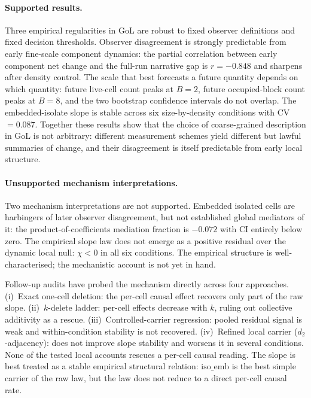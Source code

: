 \documentclass[aip,cha,preprint,nofootinbib]{revtex4-2}
\newcommand{\iso}{\mathrm{iso\_emb}}
\begin{document}
\paragraph{Supported results.}
Three empirical regularities in GoL are robust to fixed observer definitions
and fixed decision thresholds.
Observer disagreement is strongly predictable from early fine-scale component
dynamics: the partial correlation between early component net change and the
full-run narrative gap is $r=-0.848$ and sharpens after density control.
The scale that best forecasts a future quantity depends on which quantity:
future live-cell count peaks at $B=2$, future occupied-block count peaks at
$B=8$, and the two bootstrap confidence intervals do not overlap.
The embedded-isolate slope is stable across six size-by-density conditions
with CV~$=0.087$.
Together these results show that the choice of coarse-grained description
in GoL is not arbitrary: different measurement schemes yield different but
lawful summaries of change, and their disagreement is itself predictable from
early local structure.

\paragraph{Unsupported mechanism interpretations.}
Two mechanism interpretations are not supported.
Embedded isolated cells are harbingers of later observer disagreement, but
not established global mediators of it: the product-of-coefficients mediation
fraction is $-0.072$ with CI entirely below zero.
The empirical slope law does not emerge as a positive residual over the
dynamic local null: $\chi < 0$ in all six conditions.
The empirical structure is well-characterised; the mechanistic account is not
yet in hand.

Follow-up audits have probed the mechanism directly across four approaches.
(i)~Exact one-cell deletion: the per-cell causal effect recovers only part of
the raw slope.
(ii)~$k$-delete ladder: per-cell effects decrease with $k$, ruling out
collective additivity as a rescue.
(iii)~Controlled-carrier regression: pooled residual signal is weak and
within-condition stability is not recovered.
(iv)~Refined local carrier ($d_2$-adjacency): does not improve slope
stability and worsens it in several conditions.
None of the tested local accounts rescues a per-cell causal reading.
The slope is best treated as a stable empirical structural relation:
$\iso$ is the best simple carrier of the raw law, but the law does not reduce
to a direct per-cell causal rate.
\end{document}
